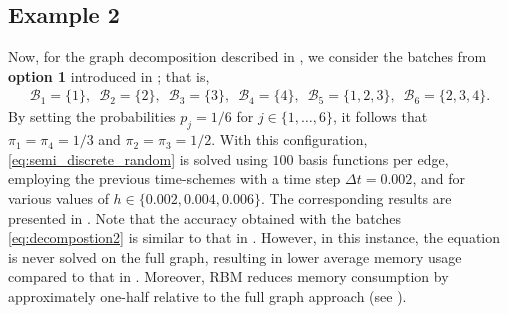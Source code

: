 \documentclass[10pt,a4paper]{amsart}
\begin{document}
\subsection{Example 2}
Now, for the graph decomposition described in , we consider the batches from {\bf option 1} introduced in ; that is,
\begin{align}\label{eq:decompostion2}
    \mathcal{B}_1 =\{1\},\,\,\, \mathcal{B}_2 =\{2\},\,\, \,\mathcal{B}_3 =\{3\},\,\,\, \mathcal{B}_4 =\{4\},\,\,\, \mathcal{B}_5 =\{1,2,3\},\,\,\, \mathcal{B}_6 =\{2,3,4\}.
\end{align}
By setting the probabilities $p_j=1/6$ for $j\in\{1,\dots,6\}$, it follows that $\pi_1=\pi_4=1/3$ and $\pi_2=\pi_3=1/2$. With this configuration, \eqref{eq:semi_discrete_random} is solved using $100$ basis functions per edge, employing the previous time-schemes with a time step $\Delta t =0.002$, and for various values of $h\in\{0.002,0.004,0.006\}$. The corresponding results are presented in . Note that the accuracy obtained with the batches \eqref{eq:decompostion2} is similar to that in . However, in this instance, the equation is never solved on the full graph, resulting in lower average memory usage compared to that in . Moreover, RBM reduces memory consumption by approximately one-half relative to the full graph approach (see ).
\begin{table}[htbp]
\centering
\caption{Performance RBM with IE and CN, using decomposition \eqref{eq:decompostion2}.}\label{table:rbm_dec2}
\end{table}
\end{document}
